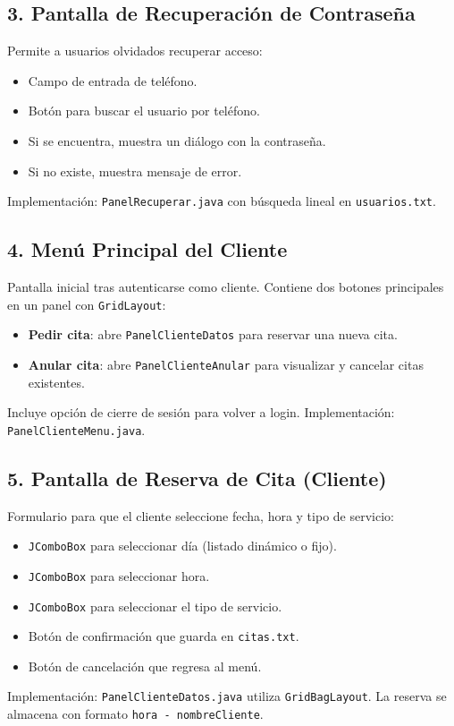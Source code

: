 \documentclass[12pt,a4paper]{report}
\begin{document}
\subsection{3. Pantalla de Recuperación de Contraseña}
Permite a usuarios olvidados recuperar acceso:
\begin{itemize}
    \item Campo de entrada de teléfono.
    \item Botón para buscar el usuario por teléfono.
    \item Si se encuentra, muestra un diálogo con la contraseña.
    \item Si no existe, muestra mensaje de error.
\end{itemize}
Implementación: \texttt{PanelRecuperar.java} con búsqueda lineal en \texttt{usuarios.txt}.

\subsection{4. Menú Principal del Cliente}
Pantalla inicial tras autenticarse como cliente. Contiene dos botones principales en un panel con \texttt{GridLayout}:
\begin{itemize}
    \item \textbf{Pedir cita}: abre \texttt{PanelClienteDatos} para reservar una nueva cita.
    \item \textbf{Anular cita}: abre \texttt{PanelClienteAnular} para visualizar y cancelar citas existentes.
\end{itemize}
Incluye opción de cierre de sesión para volver a login. Implementación: \texttt{PanelClienteMenu.java}.

\subsection{5. Pantalla de Reserva de Cita (Cliente)}
Formulario para que el cliente seleccione fecha, hora y tipo de servicio:
\begin{itemize}
    \item \texttt{JComboBox} para seleccionar día (listado dinámico o fijo).
    \item \texttt{JComboBox} para seleccionar hora.
    \item \texttt{JComboBox} para seleccionar el tipo de servicio.
    \item Botón de confirmación que guarda en \texttt{citas.txt}.
    \item Botón de cancelación que regresa al menú.
\end{itemize}
Implementación: \texttt{PanelClienteDatos.java} utiliza \texttt{GridBagLayout}. La reserva se almacena con formato \texttt{hora - nombreCliente}.
\end{document}
